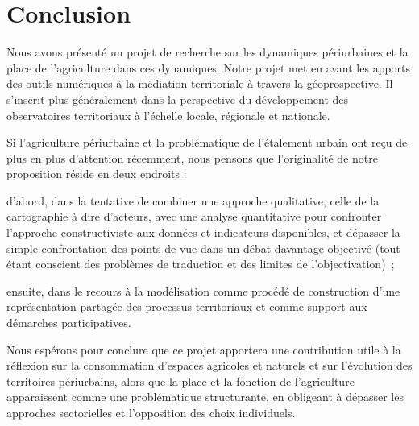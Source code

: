 \section
{Conclusion}

Nous avons présenté un projet de recherche sur les dynamiques périurbaines et
la place de l’agriculture dans ces dynamiques.
Notre projet met en avant les apports des outils numériques à la médiation
territoriale à travers la géoprospective. Il s'inscrit plus généralement dans
la perspective du développement des observatoires territoriaux à l’échelle
locale, régionale et nationale.

Si l’agriculture périurbaine et
la problématique de l’étalement urbain ont reçu de plus en plus d’attention
récemment, nous pensons que l’originalité de notre proposition réside en deux
endroits :

\startitemize

\item d’abord, dans la tentative de combiner une approche qualitative, celle de la
cartographie à dire d’acteurs, avec une analyse quantitative pour confronter
l’approche constructiviste aux données et indicateurs disponibles, et dépasser
la simple confrontation des points de vue dans un débat davantage objectivé
(tout étant conscient des problèmes de traduction et des limites de
l’objectivation) ;

\item ensuite, dans le recours à la modélisation comme procédé de construction d’une
représentation partagée des processus territoriaux et comme support aux
démarches participatives.

\stopitemize


Nous espérons pour conclure que ce projet apportera
une contribution utile à la réflexion sur la consommation d’espaces agricoles
et naturels et sur l'évolution des territoires périurbains, alors
que la place et la fonction de l’agriculture apparaissent comme une
problématique structurante, en obligeant à dépasser les approches sectorielles
et l’opposition des choix individuels.